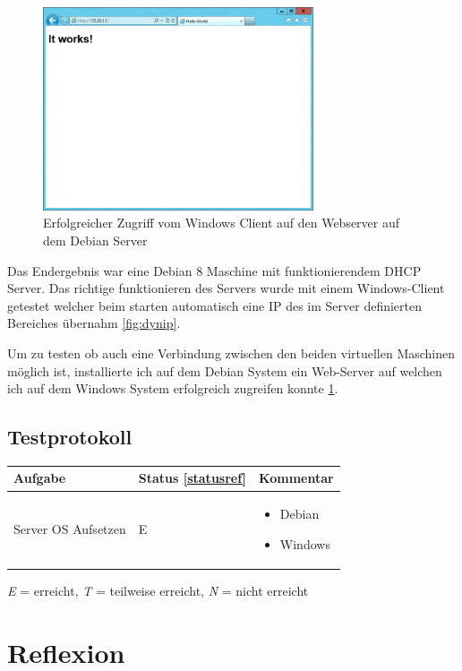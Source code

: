 \documentclass[12pt,a4paper,twoside,titlepage]{article}
\begin{document}
        \begin{figure}
          \center
          \label{fig:webserver}
          \includegraphics[width=8cm]{ie_web_example}
          \caption{Erfolgreicher Zugriff vom Windows Client auf den Webserver auf dem Debian Server}
        \end{figure}
        
        Das Endergebnis war eine Debian 8 Maschine mit funktionierendem DHCP Server. Das richtige funktionieren des Servers wurde mit einem Windows-Client getestet welcher beim starten automatisch eine IP des im Server definierten Bereiches übernahm \ref{fig:dynip}.

        Um zu testen ob auch eine Verbindung zwischen den beiden virtuellen Maschinen möglich ist, installierte ich auf dem Debian System ein Web-Server auf welchen ich auf dem Windows System erfolgreich zugreifen konnte \ref{fig:webserver}.

        \subsection{Testprotokoll}


        \begin{tabular}{|l|l|p{5cm}|}
          \hline
          \textbf{Aufgabe} & \textbf{Status \ref{statusref}} & \textbf{Kommentar} \\\hline
          Server OS Aufsetzen & E & \begin{itemize}
          \item Debian
          \item Windows
          \end{itemize} \\\hline
        \end{tabular}

        \label{statusref}
        \textit{E} = erreicht, \textit{T} = teilweise erreicht, \textit{N} = nicht erreicht 
        
        \section{Reflexion}
        
        
\end{document}
